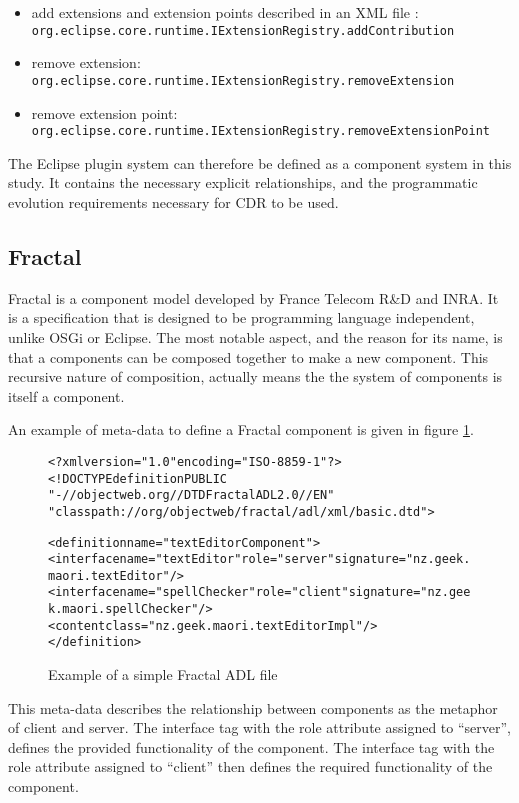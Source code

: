 \begin{itemize}
  \item add extensions and extension points described in an XML file : \verb+org.eclipse.core.runtime.IExtensionRegistry.addContribution+
  \item remove extension: \verb+org.eclipse.core.runtime.IExtensionRegistry.removeExtension+
  \item remove extension point: \verb+org.eclipse.core.runtime.IExtensionRegistry.removeExtensionPoint+
\end{itemize}

The Eclipse plugin system can therefore be defined as a component system in this study.
It contains the necessary explicit relationships, and the programmatic evolution requirements necessary for CDR to be used.

\subsection{Fractal}
Fractal is a component model developed by France Telecom R\&D and INRA.
It is a specification that is designed to be programming language independent, unlike OSGi or Eclipse.
The most notable aspect, and the reason for its name, is that a components can be composed together to make a new component.
This recursive nature of composition, actually means the the system of components is itself a component.

An example of meta-data to define a Fractal component is given in figure \ref{fractalmetadata}.

\begin{figure}[htp]
\begin{center}
\begin{alltt}
<?xml version="1.0" encoding="ISO-8859-1" ?>
<!DOCTYPE definition PUBLIC 
    "-//objectweb.org//DTD Fractal ADL 2.0//EN" 
    "classpath://org/objectweb/fractal/adl/xml/basic.dtd">

<definition name="textEditorComponent">
  <interface name="textEditor" role="server" signature="nz.geek.maori.textEditor"/>
  <interface name="spellChecker" role="client" signature="nz.geek.maori.spellChecker"/>
  <content class="nz.geek.maori.textEditorImpl"/>
</definition>
\end{alltt}
  \caption[Fractal ADL Example]{Example of a simple Fractal ADL file}
  \label{fractalmetadata}
\end{center}
\end{figure}

This meta-data describes the relationship between components as the metaphor of client and server.
The interface tag with the role attribute assigned to ``server'', defines the provided functionality of the component.
The interface tag with the role attribute assigned to ``client'' then defines the required functionality of the component.  


